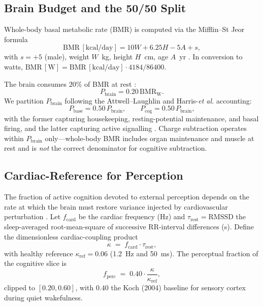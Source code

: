 \documentclass[11pt,twocolumn,a4paper]{article}
\theoremstyle{definition}
\theoremstyle{remark}
\newcommand{\Pbrain}{P_{\mathrm{brain}}}
\newcommand{\Pbase}{P_{\mathrm{base}}}
\newcommand{\Pcog}{P_{\mathrm{cog}}}
\newcommand{\fcard}{f_{\mathrm{card}}}
\newcommand{\taurest}{\tau_{\mathrm{rest}}}
\newcommand{\RMSSD}{\mathrm{RMSSD}}
\begin{document}
\subsection{Brain Budget and the 50/50 Split}

Whole-body basal metabolic rate (BMR) is computed via the Mifflin--St
Jeor formula
\begin{equation}
\mathrm{BMR}\,[\mathrm{kcal/day}] = 10 W + 6.25 H - 5 A + s,
\end{equation}
with $s=+5$ (male), weight $W$~kg, height $H$~cm, age $A$~yr
\citep{mifflin1990}. In conversion to watts,
$\mathrm{BMR}\,[\mathrm{W}] = \mathrm{BMR}\,[\mathrm{kcal/day}] \cdot
4184 / 86400$.

The brain consumes $20\%$ of BMR at rest
\citep{raichle2006,attwell2001}:
\begin{equation}
\Pbrain = 0.20\,\mathrm{BMR}_{\mathrm{W}}.
\end{equation}
We partition $\Pbrain$ following the Attwell--Laughlin and
Harris-\emph{et al.} accounting:
\begin{equation}
\Pbase = 0.50\,\Pbrain, \qquad \Pcog = 0.50\,\Pbrain,
\label{eq:fifty-fifty}
\end{equation}
with the former capturing housekeeping, resting-potential maintenance,
and basal firing, and the latter capturing active signalling
\citep{attwell2001,harris2012}. Charge subtraction operates within
$\Pbrain$ only---whole-body BMR includes organ maintenance and muscle
at rest and is \emph{not} the correct denominator for cognitive
subtraction.

\subsection{Cardiac-Reference for Perception}

The fraction of active cognition devoted to external perception
depends on the rate at which the brain must restore variance injected
by cardiovascular perturbation \citep{critchley2005,saper2002}. Let
$\fcard$ be the cardiac frequency (Hz) and $\taurest=\RMSSD$ the
sleep-averaged root-mean-square of successive RR-interval differences
(s). Define the dimensionless cardiac-coupling product
\begin{equation}
\kappa \;=\; \fcard \cdot \taurest,
\end{equation}
with healthy reference $\kappa_{\mathrm{ref}}=0.06$ (1.2~Hz and
50~ms). The perceptual fraction of the cognitive slice is
\begin{equation}
f_{\mathrm{perc}} \;=\; 0.40\cdot\frac{\kappa}{\kappa_{\mathrm{ref}}},
\label{eq:frac-perc}
\end{equation}
clipped to $[0.20,0.60]$, with $0.40$ the Koch (2004) baseline for
sensory cortex during quiet wakefulness.
\end{document}
